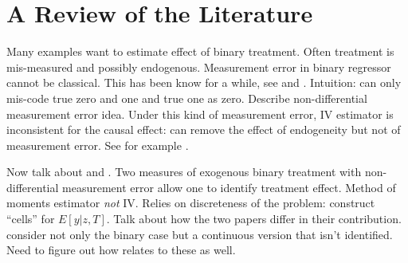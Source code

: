 \section{A Review of the Literature}

Many examples want to estimate effect of binary treatment.
Often treatment is mis-measured and possibly endogenous.
Measurement error in binary regressor cannot be classical.
This has been know for a while, see \cite{Aigner} and \cite{Bollinger}.
Intuition: can only mis-code true zero and one and true one as zero.
Describe non-differential measurement error idea.
Under this kind of measurement error, IV estimator is inconsistent for the causal effect: can remove the effect of endogeneity but not of measurement error.
See for example \cite{KRS,BBS,FL}.


Now talk about \cite{KRS} and \cite{BBS}.
Two measures of exogenous binary treatment with non-differential measurement error allow one to identify treatment effect.
Method of moments estimator \emph{not} IV.
Relies on discreteness of the problem: construct ``cells'' for $E[y|z,T]$.
Talk about how the two papers differ in their contribution.
\cite{BBS} consider not only the binary case but a continuous version that isn't identified.
Need to figure out how \cite{Card} relates to these as well.

